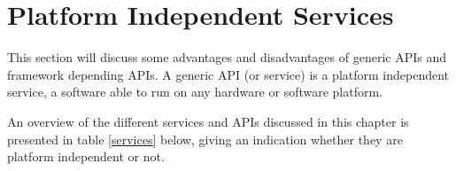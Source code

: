 
\section{Platform Independent Services}

This section will discuss some advantages and disadvantages of generic APIs and framework depending APIs. A generic API (or service) is a platform independent service, a software able to run on any hardware or software platform.

An overview of the different services and APIs discussed in this chapter is presented in table \ref{services} below, giving an indication whether they are platform independent or not.\\


